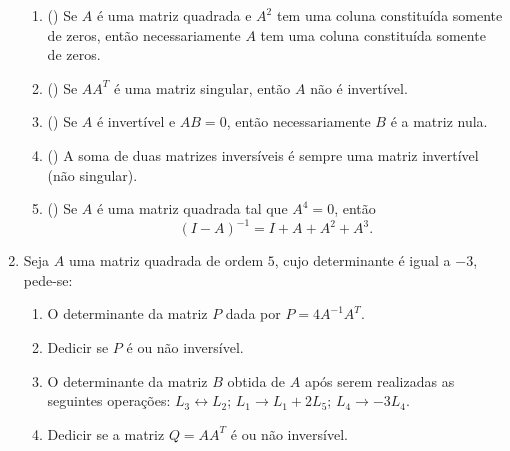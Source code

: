 \documentclass{report}
\begin{document}
\begin{Exercise}
\begin{enumerate}
\begin{enumerate}
\item  (\quad ) Se $A$ é uma matriz quadrada e $A^{2}$ tem uma
coluna constituída somente de zeros, então necessariamente $A$ tem
uma coluna constituída somente de zeros.

\item  (\quad ) Se $AA^{T}$ é uma matriz singular, então $A$ não é
invertível.

\item  (\quad ) Se $A$ é invertível e $AB=0$, então
necessariamente $B$ é a matriz nula.

\item  (\quad ) A soma de duas matrizes inversíveis é sempre uma
matriz invertível (não singular).

\item  (\quad ) Se $A$ é uma matriz quadrada tal que $A^{4}=0$,
então
$$
(I-A)^{-1}=I+A+A^{2}+A^{3}.
$$
\end{enumerate}












\item \label{1lista27} Seja $A$ uma matriz quadrada de ordem $5$,
cujo determinante é igual a $-3$, pede-se:
\begin{enumerate}
    \item O determinante da matriz $P$ dada por $P=4A^{-1}A^T$.
    \item Dedicir se $P$ é ou não inversível.
    \item O determinante da matriz $B$ obtida de $A$ após serem
    realizadas as seguintes operações: $L_3\leftrightarrow L_2$;
    $L_1 \rightarrow L_1 + 2L_5$; $L_4 \rightarrow -3 L_4$.
    \item Dedicir se a matriz $Q=AA^T$ é ou não inversível.
\end{enumerate}



\end{enumerate}
\end{Exercise}
\end{document}
